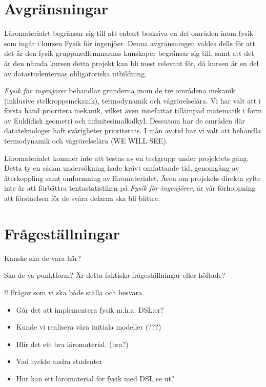 \section{Avgränsningar}

\begin{draft}

Läromaterialet begränsar sig till att enbart beskriva en del områden inom fysik som ingår i kursen Fysik för ingenjöer. Denna avgränsningen valdes dells för att det är den fysik gruppmedlemmarnas kunskaper begränsar sig till, samt att det är den nämda kursen detta projekt kan bli mest relevant för, då kursen är en del av datastudenternas obligatoriska utbildning.

\textit{Fysik för ingenjörer} behandlar grunderna inom de tre områdena mekanik (inklusive stelkroppsmekanik), termodynamik och vågrörelselära. Vi har valt att i första hand prioritera mekanik, vilket även innefattar tillämpad matematik i form av Euklidisk geometri och infinitesimalkalkyl. Dessutom har de områden där datateknologer haft svårigheter prioriterats. I mån av tid har vi valt att behandla termodynamik och vågrörelselära (WE WILL SEE). 

 
Läromaterialet kommer inte att testas av en testgrupp under projektets gång. Detta ty en sådan undersökning hade krävt omfattande tid, genomgång av återkoppling samt omformning av läromaterialet. Även om projekets direkta syfte inte är att förbättra tentastatistiken på \textit{Fysik för ingenjörer}, är vår förhoppning att förståelsen för de svåra delarna ska bli bättre.
\end{draft}


\section{Frågeställningar}

\begin{binge}

Kanske ska de vara här?

Ska de va punktform? Är detta faktiska frågeställningar eller höftade?

!! Frågor som vi ska både ställa och besvara.
\begin{itemize}
  \item Går det att implementera fysik m.h.a. DSL:er?
  \item Kunde vi realisera våra initiala modeller (???)
  \item Blir det ett bra läromaterial. (bra?)
  \item Vad tyckte andra studenter      
  \item Hur kan ett läromaterial för fysik med DSL se ut?
\end{itemize}

\end{binge}

